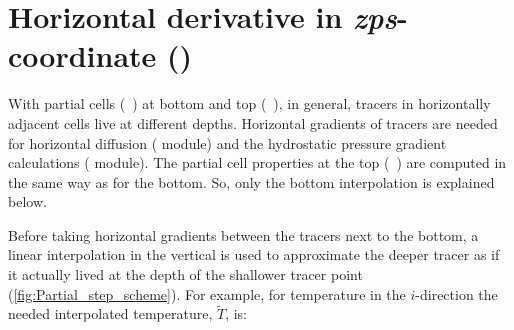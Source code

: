 \documentclass[../main/NEMO_manual]{subfiles}
\begin{document}

%

\section{Horizontal derivative in \textit{zps}-coordinate (\protect{})}
\label{sec:TRA_zpshde}


With partial cells (~) at bottom and top (~),
in general, tracers in horizontally adjacent cells live at different depths.
Horizontal gradients of tracers are needed for horizontal diffusion ( module) and
the hydrostatic pressure gradient calculations ( module).
The partial cell properties at the top (~) are computed in the same way as
for the bottom.
So, only the bottom interpolation is explained below.

Before taking horizontal gradients between the tracers next to the bottom,
a linear interpolation in the vertical is used to approximate the deeper tracer as if
it actually lived at the depth of the shallower tracer point (\autoref{fig:Partial_step_scheme}).
For example, for temperature in the $i$-direction the needed interpolated temperature, $\widetilde T$, is:
\end{document}
